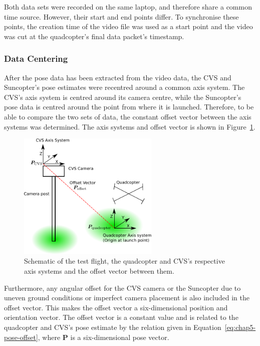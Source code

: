 Both data sets were recorded on the same laptop, and therefore share a common time source. However, their start and end points differ. To synchronise these points, the creation time of the video file was used as a start point and the video was cut at the quadcopter's final data packet's timestamp. 

\subsubsection{Data Centering}
\label{sec:chap5-data-centring}

After the pose data has been extracted from the video data, the CVS and Suncopter's pose estimates were recentred around a common axis system. The CVS's axis system is centred around its camera centre, while the Suncopter's pose data is centred around the point from where it is launched. Therefore, to be able to compare the two sets of data, the constant offset vector between the axis systems was determined. The axis systems and offset vector is shown in Figure~\ref{fig:chap5-flight-test-schem}.

\begin{figure}
  \centering
  \includegraphics[width=0.6\textwidth]{figures/chapter5/test_flight_schem}
  \caption[Shematic of the test flight layout.]{Schematic of the test flight, the quadcopter and CVS's respective axis systems and the offset vector between them.}
\label{fig:chap5-flight-test-schem}
\end{figure}

Furthermore, any angular offset for the CVS camera or the Suncopter due to uneven ground conditions or imperfect camera placement is also included in the offset vector. This makes the offset vector a six-dimensional position and orientation vector. The offset vector is a constant value and is related to the quadcopter and CVS's pose estimate by the relation given in Equation~\ref{eq:chap5-pose-offset}, where $\bm{P}$ is a six-dimensional pose vector. 

